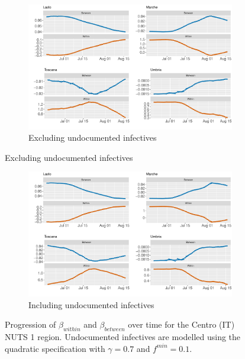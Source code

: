 \documentclass[12pt]{article}
\begin{document}
\begin{appendices}
		\begin{figure}[H]
    	    \centering
    	    \begin{subfigure}{\textwidth}
    	      \centering
    	      \includegraphics[width=0.94\linewidth]{output/model_between_lag14_betas_Centro (IT)_rolling.pdf}
    	      \caption{Excluding undocumented infectives}
    	      \label{fig:beta_between_over_time_centro_regular}
    	    \end{subfigure}
        \end{figure}
        \begin{figure}[H]\ContinuedFloat
    	    \begin{subfigure}{\textwidth}
    	      \centering
    	      \includegraphics[width=0.94\linewidth]{output/model_between_lag14_betas_Centro (IT)_UndocQuadratic_rolling.pdf}
    	      \caption{Including undocumented infectives}
    	      \label{fig:beta_between_over_time_centro_regular_undoc}
    	    \end{subfigure}
    	    \caption{Progression of $\beta_{within}$ and $\beta_{between}$ over time for the Centro (IT) NUTS 1 region. Undocumented infectives are modelled using the quadratic specification with $\gamma = 0.7$ and $f^{min}=0.1$.}
    	    \label{fig:beta_between_over_time_centro}
        \end{figure}
		

\end{appendices}
\end{document}
